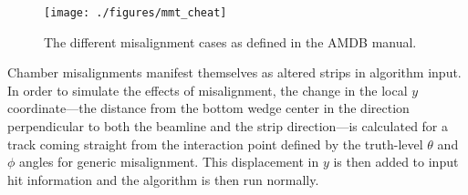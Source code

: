 \begin{comment}
\begin{figure}[!htbp]\captionsetup{justification=centering}\captionsetup{justification=centering}
  \centering
  \begin{subfigure}{0.32\textwidth}\texttt{[image: ./figures/dts]}\end{subfigure}
  \begin{subfigure}{0.32\textwidth}\texttt{[image: ./figures/dtz]}\end{subfigure}
  \begin{subfigure}{0.32\textwidth}\texttt{[image: ./figures/dtt]}\end{subfigure}
  \begin{subfigure}{0.32\textwidth}\texttt{[image: ./figures/drs]}\end{subfigure}
  \begin{subfigure}{0.32\textwidth}\texttt{[image: ./figures/drz]}\end{subfigure}
  \begin{subfigure}{0.32\textwidth}\texttt{[image: ./figures/drt]}\end{subfigure}
  \caption{\label{fig:misalscheme}The different misalignment cases as defined in the AMDB manual.}
\end{figure}
\end{comment}

\begin{figure}[!htbp]\captionsetup{justification=centering}\captionsetup{justification=centering}
  \centering
  \texttt{[image: ./figures/mmt\_cheat]}
  \caption{\label{fig:misalscheme}The different misalignment cases as defined in the AMDB manual.}
\end{figure}

Chamber misalignments manifest themselves as altered strips in algorithm input.  In order to simulate the effects of misalignment, the change in the local $y$ coordinate---the distance from the bottom wedge center in the direction perpendicular to both the beamline and the strip direction---is calculated for a track coming straight from the interaction point defined by the truth-level $\theta$ and $\phi$ angles for generic misalignment.  This displacement in $y$ is then added to input hit information and the algorithm is then run normally.

